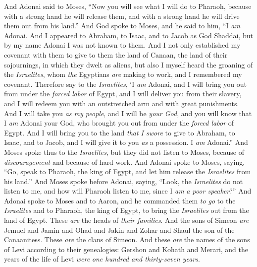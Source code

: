 \begin{biblechapter} %
 And Adonai said to Moses, “Now you will see what I will do to Pharaoh, because with a strong hand he will release them, and with a strong hand he will drive them out from his land.”
\verse And God spoke to Moses, and he said to him, “I \textit{am} Adonai.
\verse And I appeared to Abraham, to Isaac, and to Jacob as God Shaddai, but by my name Adonai I was not known to them.
\verse And I not only established my covenant with them to give to them the land of Canaan, the land of their sojournings, in which they dwelt as aliens,
\verse but also I myself heard the groaning of the \textit{Israelites}, whom \textit{the} Egyptians \textit{are} making to work, and I remembered my covenant.
\verse Therefore say to the \textit{Israelites}, ‘I \textit{am} Adonai, and I will bring you out from under the \textit{forced labor} of Egypt, and I will deliver you from their slavery, and I will redeem you with an outstretched arm and with great punishments.
\verse And I will take you \textit{as my people}, and I will be \textit{your God}, and you will know that I \textit{am} Adonai your God, who brought you out from under the \textit{forced labor} of Egypt.
\verse And I will bring you to the land \textit{that I swore} to give to Abraham, to Isaac, and to Jacob, and I will give it to you \textit{as} a possession. I \textit{am} Adonai.”
\verse And Moses spoke thus to the \textit{Israelites}, but they did not listen to Moses, because of \textit{discouragement} and because of hard work.
\verse And Adonai spoke to Moses, saying,
\verse “Go, speak to Pharaoh, the king of Egypt, and let him release the \textit{Israelites} from his land.”
\verse And Moses spoke before Adonai, saying, “Look, the \textit{Israelites} do not listen to me, and how will Pharaoh listen to me, since I \textit{am} \textit{a poor speaker}?”
\verse And Adonai spoke to Moses and to Aaron, and he commanded them \textit{to go} to the \textit{Israelites} and to Pharaoh, the king of Egypt, to bring the \textit{Israelites} out from the land of Egypt.
 These \textit{are} the heads of \textit{their families}.
\verse And the sons of Simeon \textit{are} Jemuel and Jamin and Ohad and Jakin and Zohar and Shaul the son of the Canaanitess. These \textit{are} the clans of Simeon.
\verse And these \textit{are} the names of the sons of Levi according to their genealogies: Gershon and Kohath and Merari, and the years of the life of Levi \textit{were} \textit{one hundred and thirty-seven years}.

\end{biblechapter}
